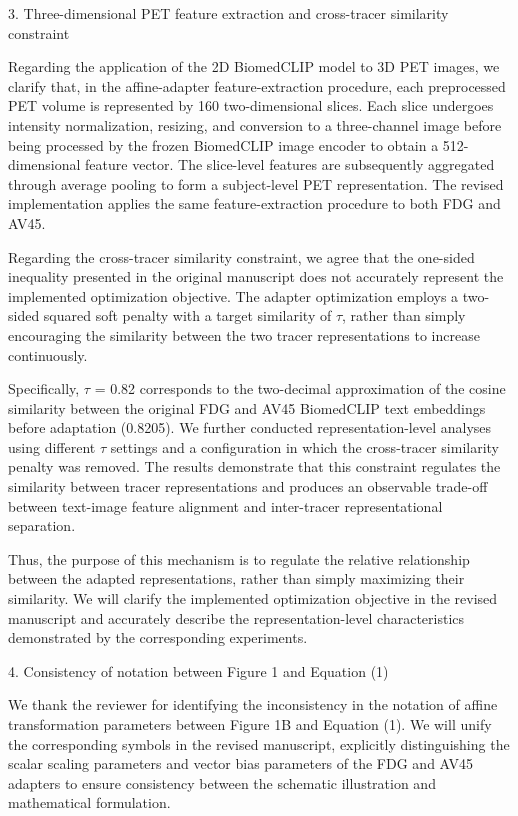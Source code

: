 {3. Three-dimensional PET feature extraction and cross-tracer similarity constraint

Regarding the application of the 2D BiomedCLIP model to 3D PET images, we clarify that, in the affine-adapter feature-extraction procedure, each preprocessed PET volume is represented by 160 two-dimensional slices. Each slice undergoes intensity normalization, resizing, and conversion to a three-channel image before being processed by the frozen BiomedCLIP image encoder to obtain a 512-dimensional feature vector. The slice-level features are subsequently aggregated through average pooling to form a subject-level PET representation. The revised implementation applies the same feature-extraction procedure to both FDG and AV45.

Regarding the cross-tracer similarity constraint, we agree that the one-sided inequality presented in the original manuscript does not accurately represent the implemented optimization objective. The adapter optimization employs a two-sided squared soft penalty with a target similarity of \ensuremath{\tau}, rather than simply encouraging the similarity between the two tracer representations to increase continuously.

Specifically, \ensuremath{\tau} = 0.82 corresponds to the two-decimal approximation of the cosine similarity between the original FDG and AV45 BiomedCLIP text embeddings before adaptation (0.8205). We further conducted representation-level analyses using different \ensuremath{\tau} settings and a configuration in which the cross-tracer similarity penalty was removed. The results demonstrate that this constraint regulates the similarity between tracer representations and produces an observable trade-off between text-image feature alignment and inter-tracer representational separation.

Thus, the purpose of this mechanism is to regulate the relative relationship between the adapted representations, rather than simply maximizing their similarity. We will clarify the implemented optimization objective in the revised manuscript and accurately describe the representation-level characteristics demonstrated by the corresponding experiments.

4. Consistency of notation between Figure 1 and Equation (1)

We thank the reviewer for identifying the inconsistency in the notation of affine transformation parameters between Figure 1B and Equation (1). We will unify the corresponding symbols in the revised manuscript, explicitly distinguishing the scalar scaling parameters and vector bias parameters of the FDG and AV45 adapters to ensure consistency between the schematic illustration and mathematical formulation.

}
